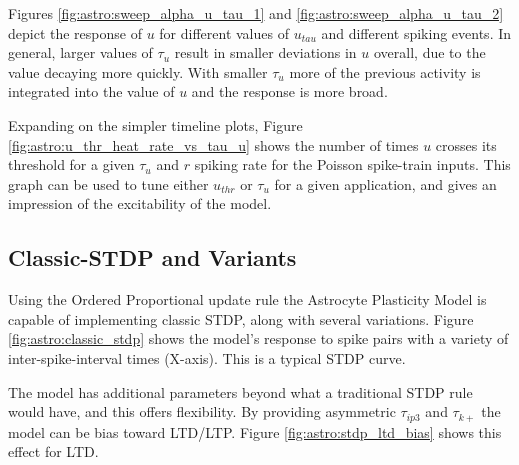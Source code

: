 
    Figures \ref{fig:astro:sweep_alpha_u_tau_1} and
    \ref{fig:astro:sweep_alpha_u_tau_2} depict the response of $u$ for
    different values of $u_{tau}$ and different spiking events. In general,
    larger values of $\tau_u$ result in smaller deviations in $u$ overall, due
    to the value decaying more quickly. With smaller $\tau_u$ more of the
    previous activity is integrated into the value of $u$ and the response is
    more broad.

    Expanding on the simpler timeline plots, Figure
    \ref{fig:astro:u_thr_heat_rate_vs_tau_u} shows the number of times $u$ crosses its
    threshold for a given $\tau_u$ and $r$ spiking rate for the Poisson
    spike-train inputs. This graph can be used to tune either $u_{thr}$ or
    $\tau_u$ for a given application, and gives an impression of the
    excitability of the model.


    \subsection{Classic-STDP and Variants} \label{sec:ordered_prop:stdp}
    
    Using the Ordered Proportional update rule the Astrocyte Plasticity Model is
    capable of implementing classic STDP, along with several variations.  Figure
    \ref{fig:astro:classic_stdp} shows the model's response to spike pairs with
    a variety of inter-spike-interval times (X-axis). This is a typical STDP
    curve.


    The model has additional parameters beyond what a traditional STDP rule
    would have, and this offers flexibility. By providing asymmetric
    $\tau_{ip3}$ and $\tau_{k+}$ the model can be bias toward LTD/LTP. Figure
    \ref{fig:astro:stdp_ltd_bias} shows this effect for LTD.

